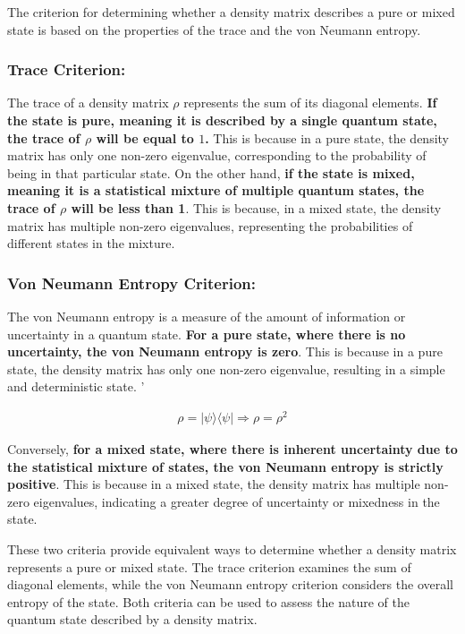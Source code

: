 \documentclass{article}
\begin{document}
The criterion for determining whether a density matrix describes a pure or mixed state is based on the properties of the trace and the von Neumann entropy.

\subsubsection{\textbf{Trace Criterion:}} The trace of a density matrix $\rho$  represents the sum of its diagonal elements. \textbf{If the state is pure, meaning it is described by a single quantum state, the trace of 
$\rho$  will be equal to $1$.} This is because in a pure state, the density matrix has only one non-zero eigenvalue, corresponding to the probability of being in that particular state. On the other hand, \textbf{if the state is mixed, meaning it is a statistical mixture of multiple quantum states, the trace of $\rho$ will be less than 1}. This is because, in a mixed state, the density matrix has multiple non-zero eigenvalues, representing the probabilities of different states in the mixture.




 \subsubsection{\textbf{Von Neumann Entropy Criterion:}} The von Neumann entropy is a measure of the amount of information or uncertainty in a quantum state. \textbf{For a pure state, where there is no uncertainty, the von Neumann entropy is zero}. This is because in a pure state, the density matrix has only one non-zero eigenvalue, resulting in a simple and deterministic state. '
 
 \begin{align*}
\rho = \vert \psi \rangle \langle \psi \vert \Rightarrow \rho = \rho^2
\end{align*}

 
 Conversely, \textbf{for a mixed state, where there is inherent uncertainty due to the statistical mixture of states, the von Neumann entropy is strictly positive}. This is because in a mixed state, the density matrix has multiple non-zero eigenvalues, indicating a greater degree of uncertainty or mixedness in the state.

These two criteria provide equivalent ways to determine whether a density matrix represents a pure or mixed state. 
The trace criterion examines the sum of diagonal elements, while the von Neumann entropy criterion considers the overall entropy of the state. Both criteria can be used to assess the nature of the quantum state described by a density matrix.
\end{document}
